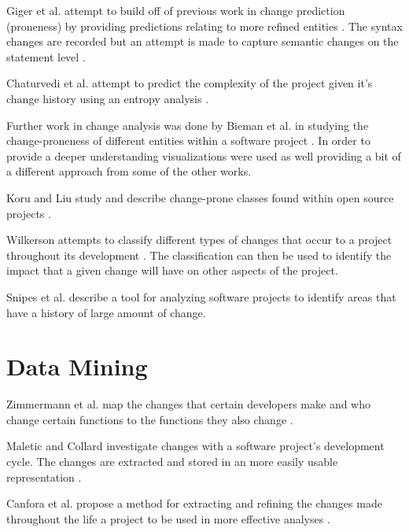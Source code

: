 Giger et al. attempt to build off of previous work in change prediction (proneness) by providing predictions relating to more refined entities \cite{Giger2012}. The syntax changes are recorded but an attempt is made to capture semantic changes on the statement level \cite{Giger2012}.

Chaturvedi et al. attempt to predict the complexity of the project given it's change history using an entropy analysis \cite{Chaturvedi2014}.

Further work in change analysis was done by Bieman et al. in studying the change-proneness of different entities within a software project \cite{Bieman2003}. In order to provide a deeper understanding visualizations were used as well providing a bit of a different approach from some of the other works.

Koru and Liu study and describe change-prone classes found within open source projects \cite{GunesKoru2007}.

Wilkerson attempts to classify different types of changes that occur to a project throughout its development \cite{Wilkerson2012}. The classification can then be used to identify the impact that a given change will have on other aspects of the project.

Snipes et al. describe a tool for analyzing software projects to identify areas that have a history of large amount of change. \cite{Snipes2011}

\section{Data Mining}

Zimmermann et al. map the changes that certain developers make and who change certain functions to the functions they also change \cite{Zimmermann2005a}. 

Maletic and Collard investigate changes with a software project's development cycle. The changes are extracted and stored in an more easily usable representation \cite{Maletic2004}.

Canfora et al. propose a method for extracting and refining the changes made throughout the life a project to be used in more effective analyses \cite{Canfora2007c}.

